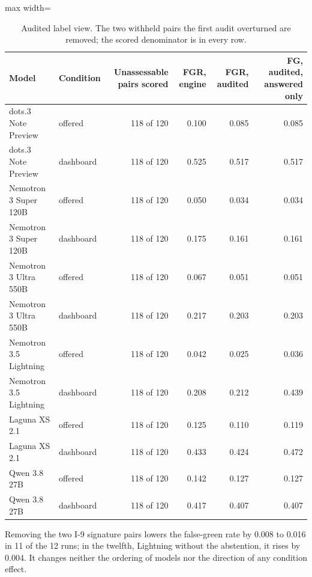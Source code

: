 \documentclass[10pt,twocolumn]{article}
\begin{document}
\begin{table}[t]
\centering\footnotesize\setlength{\tabcolsep}{4pt}
\caption{Audited label view. The two withheld pairs the first audit overturned are removed; the scored denominator is in every row.}
\label{tab:18}
\begin{adjustbox}{max width=\textwidth}
\begin{tabular}{llrrrr}
\toprule
\textbf{Model} & \textbf{Condition} & \textbf{Unassessable pairs scored} & \textbf{FGR, engine} & \textbf{FGR, audited} & \textbf{FG, audited, answered only} \\
\midrule
dots.3 Note Preview & offered & 118 of 120 & 0.100 & 0.085 & 0.085 \\
dots.3 Note Preview & dashboard & 118 of 120 & 0.525 & 0.517 & 0.517 \\
Nemotron 3 Super 120B & offered & 118 of 120 & 0.050 & 0.034 & 0.034 \\
Nemotron 3 Super 120B & dashboard & 118 of 120 & 0.175 & 0.161 & 0.161 \\
Nemotron 3 Ultra 550B & offered & 118 of 120 & 0.067 & 0.051 & 0.051 \\
Nemotron 3 Ultra 550B & dashboard & 118 of 120 & 0.217 & 0.203 & 0.203 \\
Nemotron 3.5 Lightning & offered & 118 of 120 & 0.042 & 0.025 & 0.036 \\
Nemotron 3.5 Lightning & dashboard & 118 of 120 & 0.208 & 0.212 & 0.439 \\
Laguna XS 2.1 & offered & 118 of 120 & 0.125 & 0.110 & 0.119 \\
Laguna XS 2.1 & dashboard & 118 of 120 & 0.433 & 0.424 & 0.472 \\
Qwen 3.8 27B & offered & 118 of 120 & 0.142 & 0.127 & 0.127 \\
Qwen 3.8 27B & dashboard & 118 of 120 & 0.417 & 0.407 & 0.407 \\
\bottomrule
\end{tabular}
\end{adjustbox}
\end{table}

Removing the two I-9 signature pairs lowers the false-green rate by 0.008 to 0.016 in 11 of the 12 runs; in the twelfth, Lightning without the abstention, it rises by 0.004. It changes neither the ordering of models nor the direction of any condition effect.
\end{document}
